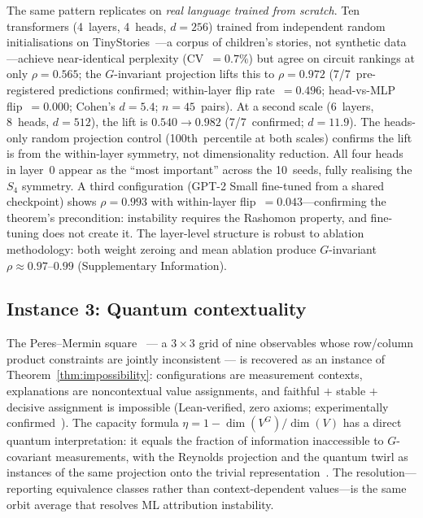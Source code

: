 \documentclass[11pt]{article}
\begin{document}
The same pattern replicates on \emph{real language trained from
scratch}.  Ten transformers (4~layers, 4~heads, $d = 256$) trained
from independent random initialisations on
TinyStories~\citep{eldan2023tinystories}---a corpus of children's
stories, not synthetic data---achieve near-identical perplexity
(CV~$= 0.7\%$) but agree on circuit rankings at only $\rho = 0.565$; the $G$-invariant projection lifts this to $\rho =
0.972$ (7/7~pre-registered predictions confirmed; within-layer flip
rate~$= 0.496$; head-vs-MLP flip~$= 0.000$; Cohen's $d = 5.4$; $n =
45$~pairs).  At a second scale (6~layers, 8~heads, $d = 512$), the lift
is $0.540 \to 0.982$ (7/7~confirmed; $d = 11.9$).  The heads-only
random projection control (100th~percentile at both scales) confirms the
lift is from the within-layer symmetry, not dimensionality reduction.
All four heads in layer~0 appear as the ``most important'' across the
10~seeds, fully realising the $S_4$ symmetry.  A third configuration
(GPT-2 Small fine-tuned from a shared checkpoint) shows $\rho = 0.993$
with within-layer flip~$= 0.043$---confirming the theorem's
precondition: instability requires the Rashomon property, and
fine-tuning does not create it.  The layer-level structure is robust
to ablation methodology: both weight zeroing and mean ablation produce
$G$-invariant $\rho \approx 0.97$--$0.99$ (Supplementary Information).

\subsection*{Instance 3: Quantum contextuality}

The Peres--Mermin square~\citep{peres1990incompatible,mermin1990simple}
--- a $3 \times 3$ grid of nine observables whose row/column product
constraints are jointly inconsistent --- is recovered as an instance of
Theorem~\ref{thm:impossibility}: configurations are measurement
contexts, explanations are noncontextual value assignments, and
faithful $+$ stable $+$ decisive assignment is impossible
(Lean-verified, zero axioms; experimentally
confirmed~\citep{kirchmair2009state,amselem2009state}).  The capacity
formula $\eta = 1 - \dim(V^G)/\dim(V)$ has a direct quantum
interpretation: it equals the fraction of information inaccessible to
$G$-covariant measurements, with the Reynolds projection and the
quantum twirl as instances of the same projection onto the trivial
representation~\citep{bartlett2007reference}.  The
resolution---reporting equivalence classes rather than
context-dependent values---is the same orbit average that resolves ML
attribution instability.
\end{document}
